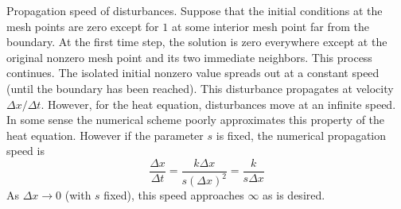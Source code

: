 \documentclass[12pt,a4paper]{article}
\begin{document}
Propagation speed of disturbances. Suppose that the initial conditions at the mesh points are zero except for $1$ at some interior mesh point far from the boundary. At the first time step, the solution is zero everywhere except at the original  nonzero mesh point and its two immediate neighbors. This process continues. The isolated initial nonzero value spreads out at a constant speed (until the boundary has been reached). This disturbance propagates at velocity $\Delta x/\Delta t$. However, for the heat equation, disturbances move at an infinite speed. In some sense the numerical  scheme poorly approximates this property of the heat equation. However if the parameter $s$ is fixed, the numerical propagation speed is
\begin{equation}
\dfrac{\Delta x}{\Delta t} = \dfrac{k \Delta x}{s(\Delta x)^2} = \dfrac{k }{s\Delta x}
\end{equation}
As $\Delta x \rightarrow 0$ (with $s$ fixed), this speed approaches $\infty$ as is desired.
\end{document}
